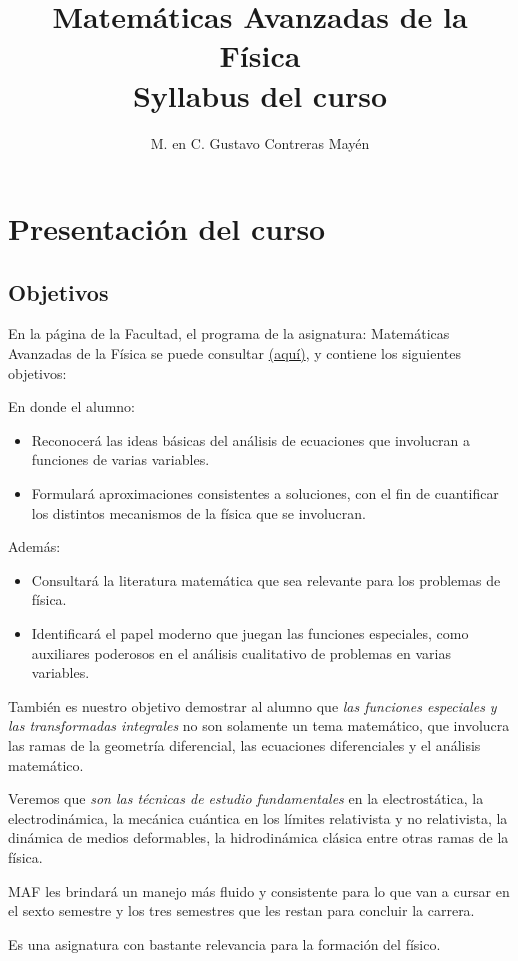 
\usepackage{apacite}
\title{Matemáticas Avanzadas de la Física \\ Syllabus del curso  \vspace{-3ex}}
\author{M. en C. Gustavo Contreras Mayén}
\date{ }


\vspace{-4cm}
\maketitle
\fontsize{14}{14}\selectfont
\tableofcontents
\newpage

\section{Presentación del curso}

\subsection{Objetivos}

En la página de la Facultad, el programa de la asignatura: Matemáticas Avanzadas de la Física se puede consultar \href{https://www.fciencias.unam.mx/sites/default/files/temario/610.pdf}{(aquí)}, y contiene los siguientes objetivos:
\par
\noindent
En donde el alumno:
\begin{itemize}
\setlength{\itemsep}{0mm}
\item Reconocerá las ideas básicas del análisis de ecuaciones que involucran a funciones de varias variables.
\item Formulará aproximaciones consistentes a soluciones, con el fin de cuantificar los distintos mecanismos de la física que se involucran.
\end{itemize}

Además:
\begin{itemize}
\setlength{\itemsep}{0mm}
\item Consultará la literatura matemática que sea relevante para los problemas de física.
\item Identificará el papel moderno que juegan las funciones especiales, como auxiliares poderosos en el análisis cualitativo de problemas en varias variables.
\end{itemize}

También es nuestro objetivo demostrar al alumno que \emph{las funciones especiales y las transformadas integrales} no son solamente un tema matemático, que involucra las ramas de la geometría diferencial, las ecuaciones diferenciales y el análisis matemático.
\par
Veremos que \emph{son las técnicas de estudio fundamentales} en la electrostática, la electrodinámica, la mecánica cuántica en los límites relativista y no relativista, la dinámica de medios deformables, la hidrodinámica clásica entre otras ramas de la física.
\par
MAF les brindará un manejo más fluido y consistente para lo que van a cursar en el sexto semestre y los tres semestres que les restan para concluir la carrera.
\par
Es una asignatura con bastante relevancia para la formación del físico.

